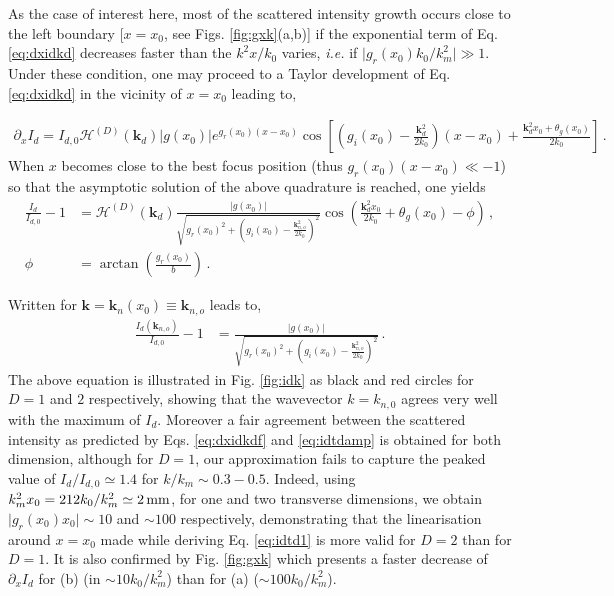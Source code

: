 \documentclass[
 reprint,
 amsmath,amssymb,
 aps,
]{revtex4-1}
\begin{document}
As the  case of interest here,  most of the scattered intensity growth occurs close to the left boundary [$x=x_0$, see Figs. \ref{fig:gxk}(a,b)] if the exponential term of Eq. \eqref{eq:dxidkd}  decreases faster than the $k^2x/k_0$ varies, \emph{i.e.} if $\vert g_r(x_0)k_0/k_m^2\vert  \gg 1$. Under these condition,  one may proceed to a Taylor development of Eq. \eqref{eq:dxidkd} in the vicinity of $x=x_0$ leading to,
\begin{widetext}
\begin{align}
   \partial_x I_d=I_{d,0} \mathcal{H}^{(D)}(\mathbf{k}_d)\vert g(x_0) \vert e^{ g_r(x_0)(x-x_0)} 
    \cos\left[  \left( g_i(x_0) -\frac{\mathbf{k}_d^2 }{2k_0} \right)(x-x_0)  +\frac{\mathbf{k}_d^2x_0 +\theta_g(x_0)}{2k_0}  \right]\, . \label{eq:idtd1}
\end{align}
When  $x$ becomes close to the best focus position (thus $g_r(x_0)(x-x_0)\ll -1$) so that the asymptotic solution of the above quadrature is reached, one yields
\begin{align}
    \frac{I_d}{I_{d,0}}-1& =  \mathcal{H}^{(D)}(\mathbf{k}_d)
   \frac{\vert g(x_0) \vert  }
    {\sqrt{g_r(x_0)^2+\left( g_i(x_0) -\frac{\mathbf{k}_{n,o}^2 }{2k_0}\right)^2}} 
    \cos\left( \frac{\mathbf{k}_d^2x_0 }{2k_0}+\theta_g(x_0) -\phi \right) \, , \nonumber \\
    \phi &= \arctan \left( \frac{g_r(x_0)}{b} \right)\, . \label{eq:idtdf}
\end{align}
\end{widetext}
Written for  $\mathbf{k}=\mathbf{k}_n(x_0)\equiv \mathbf{k}_{n,o}$ leads to,
\begin{align}
    \frac{I_d(\mathbf{k}_{n,o})}{I_{d,0}}-1& =  
   \frac{\vert g(x_0) \vert  }
    {\sqrt{g_r(x_0)^2+\left( g_i(x_0) -\frac{\mathbf{k}_{n,o}^2 }{2k_0}\right)^2}} \, . \label{eq:idtdamp}
\end{align}
The  above equation is illustrated in Fig. \ref{fig:idk} as black and red circles for $D=1$ and $2$ respectively, showing that the wavevector  $k=k_{n,0}$ agrees very well with the maximum of $I_d$. Moreover a fair agreement between  the scattered intensity as predicted by  Eqs. \eqref{eq:dxidkdf}   and  \eqref{eq:idtdamp}  is obtained for both dimension, although for $D=1$, our approximation fails to capture the peaked value of $ I_d/I_{d,0}\simeq 1.4 $ for $k/k_m\sim 0.3-0.5$. 
Indeed, using  $k_m^2x_0=212k_0/k_m^2\simeq 2\,\rm mm$, for  one and  two transverse dimensions,  we obtain  $\vert g_r(x_0)x_0 \vert  \sim 10 $  and $\sim 100$ respectively, demonstrating that the linearisation around $x=x_0$ made  while deriving Eq. \eqref{eq:idtd1} is more valid  for $D=2$ than for  $D=1$. It is also confirmed by Fig. \ref{fig:gxk} which presents a faster decrease of $\partial_x I_d$ for  (b) (in $\sim 10k_0/k_m^2$) than for  (a) ($\sim 100k_0/k_m^2$).
\end{document}
